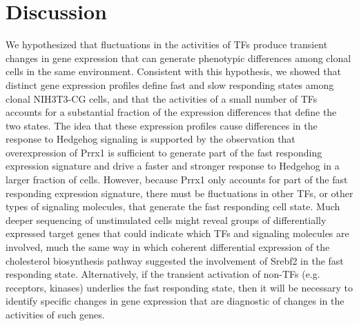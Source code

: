 \section{Discussion}

We hypothesized that fluctuations in the activities of TFs produce transient changes in gene expression that can generate phenotypic differences among clonal cells in the same environment. Consistent with this hypothesis, we showed that distinct gene expression profiles define fast and slow responding states among clonal NIH3T3-CG cells, and that the activities of a small number of TFs accounts for a substantial fraction of the expression differences that define the two states. The idea that these expression profiles cause differences in the response to Hedgehog signaling is supported by the observation that overexpression of Prrx1 is sufficient to generate part of the fast responding expression signature and drive a faster and stronger response to Hedgehog in a larger fraction of cells. However, because Prrx1 only accounts for part of the fast responding expression signature, there must be fluctuations in other TFs\cite{Sigal2006-ds}, or other types of signaling molecules, that generate the fast responding cell state. Much deeper sequencing of unstimulated cells might reveal groups of differentially expressed target genes that could indicate which TFs and signaling molecules are involved, much the same way in which coherent differential expression of the cholesterol biosynthesis pathway suggested the involvement of Srebf2 in the fast responding state. Alternatively, if the transient activation of non-TFs (e.g. receptors, kinases)\cite{Colman-Lerner2005-ln} underlies the fast responding state, then it will be necessary to identify specific changes in gene expression that are diagnostic of changes in the activities of such genes.

